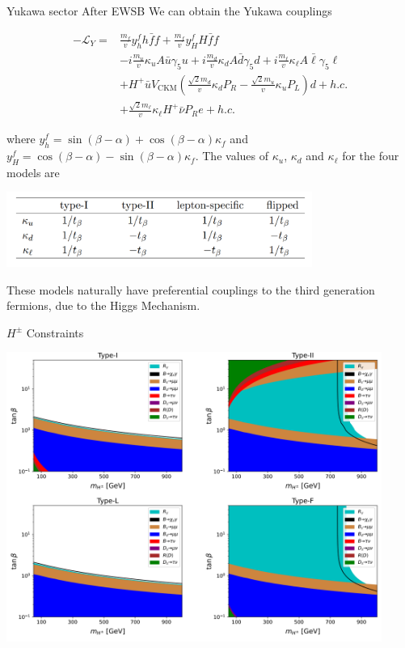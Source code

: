 \documentclass{../bredelebeamer}
\begin{document}
\begin{frame}{Yukawa sector After EWSB}
    We can obtain the Yukawa couplings

    $$
    \begin{aligned}
    -\mathcal{L}_Y= & \frac{m_f}{v} y_h^f h \bar{f} f+\frac{m_f}{v} y_H^f H \bar{f} f \\
    & -i \frac{m_u}{v} \kappa_u A \bar{u} \gamma_5 u+i \frac{m_d}{v} \kappa_d A \bar{d} \gamma_5 d+i \frac{m_{\ell}}{v} \kappa_{\ell} A \bar{\ell} \gamma_5 \ell \\
    & +H^{+} \bar{u} V_{\mathrm{CKM}}\left(\frac{\sqrt{2} m_d}{v} \kappa_d P_R-\frac{\sqrt{2} m_u}{v} \kappa_u P_L\right) d+h . c . \\
    & +\frac{\sqrt{2} m_{\ell}}{v} \kappa_{\ell} H^{+} \bar{\nu} P_R e+h . c .
    \end{aligned}
    $$

    where $y_h^f=\sin (\beta-\alpha)+\cos (\beta-\alpha) \kappa_f$ and $y_H^f=\cos (\beta-\alpha)-\sin (\beta-\alpha) \kappa_f$. The values of $\kappa_u$, $\kappa_d$ and $\kappa_{\ell}$ for the four models are
    \begin{center}
        \includegraphics[width=0.75\textwidth]{Table_kappa.png}
    \end{center}
    These models naturally have preferential couplings to the third generation fermions, due to the Higgs Mechanism.
\end{frame}
\begin{frame}{$H^\pm$ Constraints}
    \begin{center}
        \includegraphics[width=0.92\textwidth]{Hpm_Constrains_by_Model.png}
    \end{center}
\end{frame}
\end{document}
